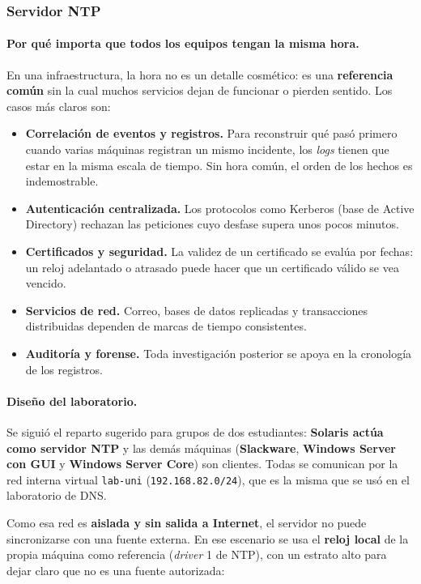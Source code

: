 \documentclass[11pt,a4paper]{report}
\begin{document}
\subsubsection{Servidor NTP}

\paragraph{Por qué importa que todos los equipos tengan la misma hora.} En una
infraestructura, la hora no es un detalle cosmético: es una \textbf{referencia
común} sin la cual muchos servicios dejan de funcionar o pierden sentido. Los
casos más claros son:

\begin{itemize}
  \item \textbf{Correlación de eventos y registros.} Para reconstruir qué pasó
        primero cuando varias máquinas registran un mismo incidente, los
        \emph{logs} tienen que estar en la misma escala de tiempo. Sin hora común,
        el orden de los hechos es indemostrable.
  \item \textbf{Autenticación centralizada.} Los protocolos como Kerberos
        (base de Active Directory) rechazan las peticiones cuyo desfase supera
        unos pocos minutos.
  \item \textbf{Certificados y seguridad.} La validez de un certificado se evalúa
        por fechas: un reloj adelantado o atrasado puede hacer que un certificado
        válido se vea vencido.
  \item \textbf{Servicios de red.} Correo, bases de datos replicadas y
        transacciones distribuidas dependen de marcas de tiempo consistentes.
  \item \textbf{Auditoría y forense.} Toda investigación posterior se apoya en la
        cronología de los registros.
\end{itemize}

\paragraph{Diseño del laboratorio.} Se siguió el reparto sugerido para grupos de
dos estudiantes: \textbf{Solaris actúa como servidor NTP} y las demás máquinas
(\textbf{Slackware}, \textbf{Windows Server con GUI} y \textbf{Windows Server
Core}) son clientes. Todas se comunican por la red interna virtual \texttt{lab-uni}
(\texttt{192.168.82.0/24}), que es la misma que se usó en el laboratorio de DNS.

Como esa red es \textbf{aislada y sin salida a Internet}, el servidor no puede
sincronizarse con una fuente externa. En ese escenario se usa el \textbf{reloj
local} de la propia máquina como referencia (\emph{driver} 1 de NTP), con un
estrato alto para dejar claro que no es una fuente autorizada:
\end{document}
